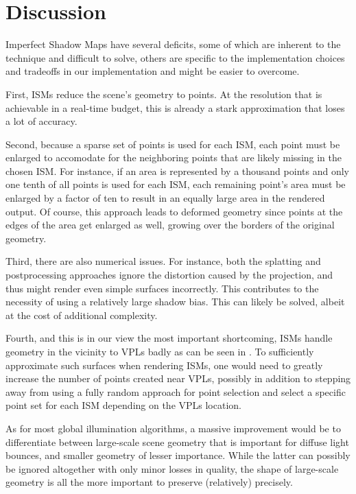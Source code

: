  \section{Discussion}


 Imperfect Shadow Maps have several deficits, some of which are inherent to the technique and difficult to solve, others are specific to the implementation choices and tradeoffs in our implementation and might be easier to overcome.

 First, ISMs reduce the scene's geometry to points. At the resolution that is achievable in a real-time budget, this is already a stark approximation that loses a lot of accuracy.

 Second, because a sparse set of points is used for each ISM, each point must be enlarged to accomodate for the neighboring points that are likely missing in the chosen ISM. For instance, if an area is represented by a thousand points and only one tenth of all points is used for each ISM, each remaining point's area must be enlarged by a factor of ten to result in an equally large area in the rendered output. Of course, this approach leads to deformed geometry since points at the edges of the area get enlarged as well, growing over the borders of the original geometry.

 Third, there are also numerical issues. For instance, both the splatting and postprocessing approaches ignore the distortion caused by the projection, and thus might render even simple surfaces incorrectly. This contributes to the necessity of using a relatively large shadow bias. This can likely be solved, albeit at the cost of additional complexity.

 Fourth, and this is in our view the most important shortcoming, ISMs handle geometry in the vicinity to VPLs badly as can be seen in . To sufficiently approximate such surfaces when rendering ISMs, one would need to greatly increase the number of points created near VPLs, possibly in addition to stepping away from using a fully random approach for point selection and select a specific point set for each ISM depending on the VPLs location.

 As for most global illumination algorithms, a massive improvement would be to differentiate between large-scale scene geometry that is important for diffuse light bounces, and smaller geometry of lesser importance. While the latter can possibly be ignored altogether with only minor losses in quality, the shape of large-scale geometry is all the more important to preserve (relatively) precisely.



